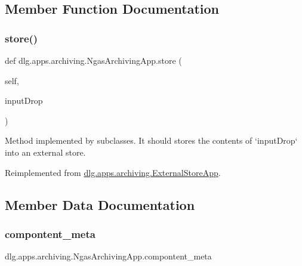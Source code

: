 \subsection{Member Function Documentation}
\mbox{\label{classdlg_1_1apps_1_1archiving_1_1_ngas_archiving_app_a6823199a640bdd4c5991b8728d7af490}} 
\subsubsection{\texorpdfstring{store()}{store()}}
{\footnotesize\ttfamily def dlg.\+apps.\+archiving.\+Ngas\+Archiving\+App.\+store (\begin{DoxyParamCaption}\item[{}]{self,  }\item[{}]{input\+Drop }\end{DoxyParamCaption})}

\begin{DoxyVerb}Method implemented by subclasses. It should stores the contents of
`inputDrop` into an external store.
\end{DoxyVerb}
 

Reimplemented from \mbox{\hyperlink{classdlg_1_1apps_1_1archiving_1_1_external_store_app_a6a41c4de0c0a291d8d7924563a592a64}{dlg.\+apps.\+archiving.\+External\+Store\+App}}.



\subsection{Member Data Documentation}
\mbox{\label{classdlg_1_1apps_1_1archiving_1_1_ngas_archiving_app_a31d193eac7d450752df236321c8c2f25}} 
\subsubsection{\texorpdfstring{compontent\_meta}{compontent\_meta}}
{\footnotesize\ttfamily dlg.\+apps.\+archiving.\+Ngas\+Archiving\+App.\+compontent\+\_\+meta\hspace{0.3cm}{\ttfamily [static]}}

